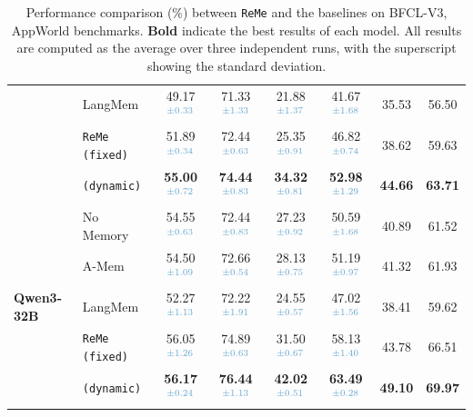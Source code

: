 \documentclass[11pt]{article}
\newcommand{\ours}{\texttt{ReMe}}
\begin{document}
\begin{table}
{\begin{tabular}{llcccccc}
         & LangMem & 49.17$^{\textcolor{lightblue}{\pm0.33}}$& 71.33$^{\textcolor{lightblue}{\pm1.33}}$ & 21.88$^{\textcolor{lightblue}{\pm1.37}}$& 41.67$^{\textcolor{lightblue}{\pm1.68}}$ & 35.53&56.50 \\ 
         & {\ours} \texttt{(fixed)} & 51.89$^{\textcolor{lightblue}{\pm0.34}}$& 72.44$^{\textcolor{lightblue}{\pm0.63}}$ & 25.35$^{\textcolor{lightblue}{\pm0.91}}$& 46.82$^{\textcolor{lightblue}{\pm0.74}}$ & 38.62&59.63  \\ 
         & \cellcolor{gray!15}{\ours} \texttt{(dynamic)} & \cellcolor{gray!15}\textbf{55.00}$^{\textcolor{lightblue}{\pm0.72}}$ & \cellcolor{gray!15}\textbf{74.44}$^{\textcolor{lightblue}{\pm0.83}}$  & \cellcolor{gray!15}\textbf{34.32}$^{\textcolor{lightblue}{\pm0.81}}$  & \cellcolor{gray!15}\textbf{52.98}$^{\textcolor{lightblue}{\pm1.29}}$ &\cellcolor{gray!15}\textbf{44.66}&\cellcolor{gray!15}\textbf{63.71} \\ 
    \midrule
        \multirow{5}{*}{\textbf{Qwen3-32B}} & No Memory & 54.55$^{\textcolor{lightblue}{\pm0.63}}$ & 72.44$^{\textcolor{lightblue}{\pm0.83}}$ & 27.23$^{\textcolor{lightblue}{\pm0.92}}$ & 50.59$^{\textcolor{lightblue}{\pm1.68}}$ & 40.89&61.52 \\ 
         & A-Mem & 54.50$^{\textcolor{lightblue}{\pm1.09}}$& 72.66$^{\textcolor{lightblue}{\pm0.54}}$ &28.13$^{\textcolor{lightblue}{\pm0.75}}$& 51.19$^{\textcolor{lightblue}{\pm0.97}}$ & 41.32&61.93\\ 
         & LangMem & 52.27$^{\textcolor{lightblue}{\pm1.13}}$& 72.22$^{\textcolor{lightblue}{\pm1.91}}$& 24.55$^{\textcolor{lightblue}{\pm0.57}}$& 47.02$^{\textcolor{lightblue}{\pm1.56}}$& 38.41 & 59.62 \\ 
         & {\ours} \texttt{(fixed)} & 56.05$^{\textcolor{lightblue}{\pm1.26}}$& 74.89$^{\textcolor{lightblue}{\pm0.63}}$  & 31.50$^{\textcolor{lightblue}{\pm0.67}}$& 58.13$^{\textcolor{lightblue}{\pm1.40}}$&43.78&66.51 \\ 
         & \cellcolor{gray!15}{\ours} \texttt{(dynamic)} & \cellcolor{gray!15}\textbf{56.17}$^{\textcolor{lightblue}{\pm0.24}}$& \cellcolor{gray!15}\textbf{76.44}$^{\textcolor{lightblue}{\pm1.13}}$ & \cellcolor{gray!15}\textbf{42.02}$^{\textcolor{lightblue}{\pm0.51}}$& \cellcolor{gray!15}\textbf{63.49}$^{\textcolor{lightblue}{\pm0.28}}$ & \cellcolor{gray!15}\textbf{49.10} & \cellcolor{gray!15}\textbf{69.97} \\ 
    \bottomrule
    \end{tabular}
    }
    \caption{Performance comparison (\%) between {\ours} and the baselines on BFCL-V3, AppWorld benchmarks. \textbf{Bold} indicate the best results of each model. All results are computed as the average over three independent runs, with the superscript showing the standard deviation.}\label{tab:main}
\end{table}
\end{document}
